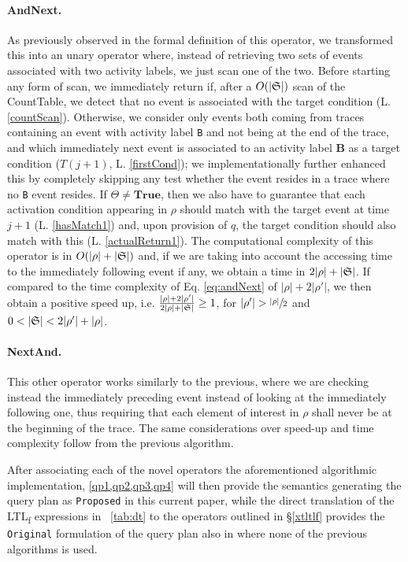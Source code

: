 \documentclass[sigconf]{acmart}
\begin{document}
\paragraph{AndNext.} As previously observed in the formal definition of this operator, we transformed this into an unary operator where, instead of retrieving two sets of events associated with two activity labels, we just scan one of the two. Before starting any form of scan, we immediately return if, after a $O(|\mathfrak{S}|)$ scan of the CountTable, we detect that no event is associated with the target condition (L. \ref{countScan}). Otherwise, we consider only events both coming from traces containing an event with  activity label \texttt{B} and not being at the end of the trace, and which immediately next event is associated to an activity label \textbf{B} as a target condition ($T(j+1)$, L. \ref{firstCond}); we implementationally further enhanced this by completely skipping any test whether the event resides in a trace where no \texttt{B} event resides. If $\Theta\neq\textbf{True}$, then we also have to guarantee that each activation condition appearing in $\rho$ should match with the target event at time $j+1$ (L. \ref{hasMatch1}) and, upon provision of $q$, the target condition should also match with this (L. \ref{actualReturn1}). The computational complexity of this operator is in $O(|\rho|+|\mathfrak{S}|)$ and, if we are taking into account the accessing time to the immediately following event if any, we obtain a time in $2|\rho|+|\mathfrak{S}|$. If compared to the time complexity of Eq. \ref{eq:andNext} of $|\rho|+2|\rho'|$, we then obtain a positive speed up, i.e. $\frac{|\rho|+2|\rho'|}{2|\rho|+|\mathfrak{S}|}\geq 1$, for $|\rho'|>\sfrac{|\rho|}{2}$ and $0<|\LOG|<2|\rho'|+|\rho|$.  \medskip

\paragraph{NextAnd.} This other operator works similarly to the previous, where we are checking instead the immediately preceding event instead of looking at the immediately following one, thus requiring that each element of interest in $\rho$ shall never be at the beginning of the trace. The same considerations over speed-up and time complexity follow from the previous algorithm. %
\medskip

After associating each of the novel operators the aforementioned algorithmic implementation,  \cref{qp1,qp2,qp3,qp4} will then provide the semantics generating the query plan as \texttt{Proposed} in this current paper, while the direct translation of the LTL\textsubscript{f} expressions in \tablename~\ref{tab:dt} to the operators outlined in \S\ref{xtltlf} provides the \texttt{Original} formulation of the query plan also in \cite{info14030173} where none of the previous algorithms is used.
\end{document}
